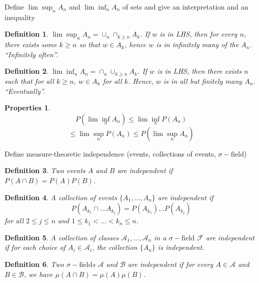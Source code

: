 \documentclass[avery5388,grid,frame]{flashcards}
\newcommand{\sigf}{\sigma-\text{field}}
\newcommand{\F}{\mathcal F}
\newtheorem*{definition}{Definition}
\newtheorem*{properties}{Properties}
\begin{document}
\begin{flashcard}
    {Define $\lim \sup_n A_n$ and $\lim \inf_n A_n$ of sets and give an interpretation and an inequality}
    \begin{definition}
        $\lim \sup_n A_n = \cup_n \cap_{k \geq n} A_k$. If $w$ is in LHS, then for every $n$, there exists some $k \geq n$ so that $w \in A_k$, hence $w$ is in infinitely many of the $A_n$. ``Infinitely often''.
    \end{definition}
    \begin{definition}
        $\lim \inf_n A_n = \cap_n \cup_{k \geq n} A_k$. If $w$ is in LHS, then there exists $n$ such that for all $k \geq n$, $w \in A_k$ for all $k$. Hence, $w$ is in all but finitely many $A_n$. ``Eventually''.
    \end{definition}
    \begin{properties}
        $$P(\lim \inf_n A_n) \leq \lim \inf_n P(A_n)$$
        $$\leq \lim \sup_n P(A_n) \leq P(\lim \sup_n A_n)$$
    \end{properties}
\end{flashcard}


\begin{flashcard}
    {Define measure-theoretic independence (events, collections of events, $\sigf$)}
    \begin{definition}
        Two events $A$ and $B$ are independent if $P(A \cap B) = P(A) P(B)$.
    \end{definition}

    \begin{definition}
        A collection of events $\{ A_1, \dots, A_n \}$ are independent if
        $$P(A_{k_1} \cap \dots A_{k_j}) = P(A_{k_1}) \dots P(A_{k_j})$$
        for all $2 \leq j \leq n$ and $1 \leq k_1 < \dots < k_n \leq n$.
    \end{definition}

    \begin{definition}
        A collection of classes $\mathcal A_1, \dots, \mathcal A_n$ in a $\sigf$ $\F$ are independent if for each choice of $A_i \in \mathcal A_i$, the collection $\{ A_n \}$ is independent.
    \end{definition}

    \begin{definition}
        Two $\sigf$s $\mathcal A$ and $\mathcal B$ are independent if for every $A \in \mathcal A$ and $B \in \mathcal B$, we have $\mu(A \cap B) = \mu(A) \mu(B)$.
    \end{definition}
\end{flashcard}
\end{document}
